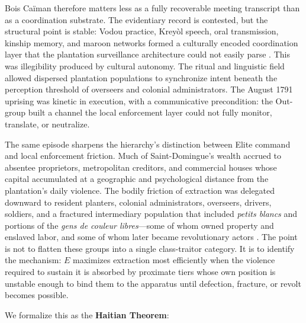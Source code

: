 Bois Ca\"iman therefore matters less as a fully recoverable meeting transcript than as a coordination substrate. The evidentiary record is contested, but the structural point is stable: Vodou practice, Krey\`ol speech, oral transmission, kinship memory, and maroon networks formed a culturally encoded coordination layer that the plantation surveillance architecture could not easily parse \cite{geggus_haitian_revolution,james_black_jacobins}. This was illegibility produced by cultural autonomy. The ritual and linguistic field allowed dispersed plantation populations to synchronize intent beneath the perception threshold of overseers and colonial administrators. The August 1791 uprising was kinetic in execution, with a communicative precondition: the Out-group built a channel the local enforcement layer could not fully monitor, translate, or neutralize.

The same episode sharpens the hierarchy's distinction between Elite command and local enforcement friction. Much of Saint-Domingue's wealth accrued to absentee proprietors, metropolitan creditors, and commercial houses whose capital accumulated at a geographic and psychological distance from the plantation's daily violence. The bodily friction of extraction was delegated downward to resident planters, colonial administrators, overseers, drivers, soldiers, and a fractured intermediary population that included \textit{petits blancs} and portions of the \textit{gens de couleur libres}---some of whom owned property and enslaved labor, and some of whom later became revolutionary actors \cite{dubois_avengers_new_world,geggus_haitian_revolution}. The point is not to flatten these groups into a single class-traitor category. It is to identify the mechanism: $E$ maximizes extraction most efficiently when the violence required to sustain it is absorbed by proximate tiers whose own position is unstable enough to bind them to the apparatus until defection, fracture, or revolt becomes possible.

We formalize this as the \textbf{Haitian Theorem}:

